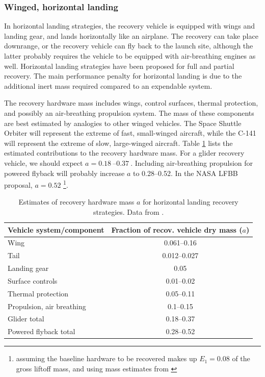 \documentclass[conf]{new-aiaa}
\begin{document}
\subsubsection{Winged, horizontal landing}
In horizontal landing strategies, the recovery vehicle is equipped with wings and landing gear, and lands horizontally like an airplane. The recovery can take place downrange, or the recovery vehicle can fly back to the launch site, although the latter probably requires the vehicle to be equipped with air-breathing engines as well. Horizontal landing strategies have been proposed for full and partial recovery. The main performance penalty for horizontal landing is due to the additional inert mass required compared to an expendable system.

The recovery hardware mass includes wings, control surfaces, thermal protection, and possibly an air-breathing propulsion system. The mass of these components are best estimated by analogies to other winged vehicles. The Space Shuttle Orbiter will represent the extreme of fast, small-winged aircraft, while the C-141 will represent the extreme of slow, large-winged aircraft. Table \ref{tab:winged_strategies} lists the estimated contributions to the recovery hardware mass. For a glider recovery vehicle, we should expect $a = \SIrange{0.18}{0.37}{}$. Including air-breathing propulsion for powered flyback will probably increase $a$ to \SIrange{0.28}{0.52}{}. In the NASA LFBB proposal, $a=0.52$ \footnote{assuming the baseline hardware to be recovered makes up $E_1=0.08$ of the gross liftoff mass, and using mass estimates from \cite{Healy1998}}.

\begin{table}
	\caption{\label{tab:winged_strategies} Estimates of recovery hardware mass $a$ for horizontal landing recovery strategies. Data from \cite{Sforza2015}.}
	\centering
	\begin{tabular}{l c}
		Vehicle system/component  & Fraction of recov. vehicle dry mass ($a$) \\
		\hline
		Wing                      & \SIrange{0.061}{0.16}{} \\
		Tail                      & \SIrange{0.012}{0.027}{}\\
		Landing gear              & 0.05 \\
		Surface controls          & \SIrange{0.01}{0.02}{} \\
		Thermal protection        & \SIrange{0.05}{0.11}{} \\
		Propulsion, air breathing & \SIrange{0.1}{0.15}{} \\
		\hline
		Glider total         & \SIrange{0.18}{0.37}{} \\
		Powered flyback total        & \SIrange{0.28}{0.52}{} \\
		\hline
	\end{tabular}
\end{table}
\end{document}
